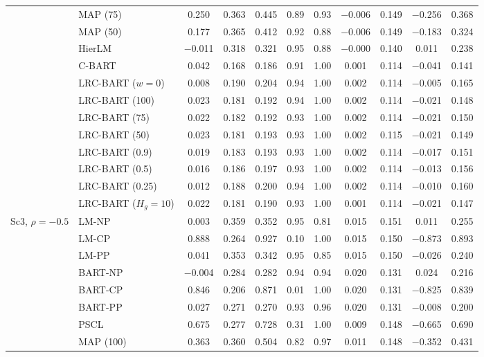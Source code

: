 \begin{center}
\begin{longtable}{llccccccccc}
& MAP (75) & 0.250 & 0.363 & 0.445 & 0.89 & 0.93 & $-$0.006 & 0.149 & $-$0.256 & 0.368 \\
& MAP (50) & 0.177 & 0.365 & 0.412 & 0.92 & 0.88 & $-$0.006 & 0.149 & $-$0.183 & 0.324 \\
& HierLM & $-$0.011 & 0.318 & 0.321 & 0.95 & 0.88 & $-$0.000 & 0.140 & 0.011 & 0.238 \\
& C-BART & 0.042 & 0.168 & 0.186 & 0.91 & 1.00 & 0.001 & 0.114 & $-$0.041 & 0.141 \\
& LRC-BART ($w=0$) & 0.008 & 0.190 & 0.204 & 0.94 & 1.00 & 0.002 & 0.114 & $-$0.005 & 0.165 \\
& LRC-BART (100) & 0.023 & 0.181 & 0.192 & 0.94 & 1.00 & 0.002 & 0.114 & $-$0.021 & 0.148 \\
& LRC-BART (75) & 0.022 & 0.182 & 0.192 & 0.93 & 1.00 & 0.002 & 0.114 & $-$0.021 & 0.150 \\
& LRC-BART (50) & 0.023 & 0.181 & 0.193 & 0.93 & 1.00 & 0.002 & 0.115 & $-$0.021 & 0.149 \\
& LRC-BART (0.9) & 0.019 & 0.183 & 0.193 & 0.93 & 1.00 & 0.002 & 0.114 & $-$0.017 & 0.151 \\
& LRC-BART (0.5) & 0.016 & 0.186 & 0.197 & 0.93 & 1.00 & 0.002 & 0.114 & $-$0.013 & 0.156 \\
& LRC-BART (0.25) & 0.012 & 0.188 & 0.200 & 0.94 & 1.00 & 0.002 & 0.114 & $-$0.010 & 0.160 \\
& LRC-BART ($H_g=10$) & 0.022 & 0.181 & 0.190 & 0.93 & 1.00 & 0.001 & 0.114 & $-$0.021 & 0.147 \\
\midrule
\multirow{20}{*}{Sc3, $\rho=-0.5$} & LM-NP & 0.003 & 0.359 & 0.352 & 0.95 & 0.81 & 0.015 & 0.151 & 0.011 & 0.255 \\
& LM-CP & 0.888 & 0.264 & 0.927 & 0.10 & 1.00 & 0.015 & 0.150 & $-$0.873 & 0.893 \\
& LM-PP & 0.041 & 0.353 & 0.342 & 0.95 & 0.85 & 0.015 & 0.150 & $-$0.026 & 0.240 \\
& BART-NP & $-$0.004 & 0.284 & 0.282 & 0.94 & 0.94 & 0.020 & 0.131 & 0.024 & 0.216 \\
& BART-CP & 0.846 & 0.206 & 0.871 & 0.01 & 1.00 & 0.020 & 0.131 & $-$0.825 & 0.839 \\
& BART-PP & 0.027 & 0.271 & 0.270 & 0.93 & 0.96 & 0.020 & 0.131 & $-$0.008 & 0.200 \\
& PSCL & 0.675 & 0.277 & 0.728 & 0.31 & 1.00 & 0.009 & 0.148 & $-$0.665 & 0.690 \\
& MAP (100) & 0.363 & 0.360 & 0.504 & 0.82 & 0.97 & 0.011 & 0.148 & $-$0.352 & 0.431 \\

\end{longtable}
\end{center}
